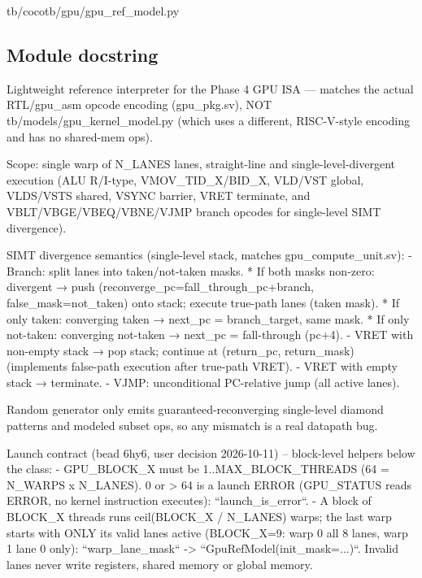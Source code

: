 \begin{relocated}{tb/cocotb/gpu/gpu_ref_model.py}

\subsection*{Module docstring}

\begin{textblock}
Lightweight reference interpreter for the Phase 4 GPU ISA — matches the actual
RTL/gpu_asm opcode encoding (gpu_pkg.sv), NOT tb/models/gpu_kernel_model.py
(which uses a different, RISC-V-style encoding and has no shared-mem ops).

Scope: single warp of N_LANES lanes, straight-line and single-level-divergent
execution (ALU R/I-type, VMOV_TID_X/BID_X, VLD/VST global, VLDS/VSTS shared,
VSYNC barrier, VRET terminate, and VBLT/VBGE/VBEQ/VBNE/VJMP branch opcodes for
single-level SIMT divergence).

SIMT divergence semantics (single-level stack, matches gpu_compute_unit.sv):
- Branch: split lanes into taken/not-taken masks.
* If both masks non-zero: divergent → push (reconverge_pc=fall_through_pc+branch,
false_mask=not_taken) onto stack; execute true-path lanes (taken mask).
* If only taken: converging taken → next_pc = branch_target, same mask.
* If only not-taken: converging not-taken → next_pc = fall-through (pc+4).
- VRET with non-empty stack → pop stack; continue at (return_pc, return_mask)
(implements false-path execution after true-path VRET).
- VRET with empty stack → terminate.
- VJMP: unconditional PC-relative jump (all active lanes).

Random generator only emits guaranteed-reconverging single-level diamond patterns
and modeled subset ops, so any mismatch is a real datapath bug.

Launch contract (bead 6hy6, user decision 2026-10-11) -- block-level helpers below the class:
- GPU_BLOCK_X must be 1..MAX_BLOCK_THREADS (64 = N_WARPS x N_LANES).  0 or > 64 is a launch
ERROR (GPU_STATUS reads ERROR, no kernel instruction executes): ``launch_is_error``.
- A block of BLOCK_X threads runs ceil(BLOCK_X / N_LANES) warps; the last warp starts with
ONLY its valid lanes active (BLOCK_X=9: warp 0 all 8 lanes, warp 1 lane 0 only):
``warp_lane_mask`` -> ``GpuRefModel(init_mask=...)``.  Invalid lanes never write registers,
shared memory or global memory.
\end{textblock}

\end{relocated}

